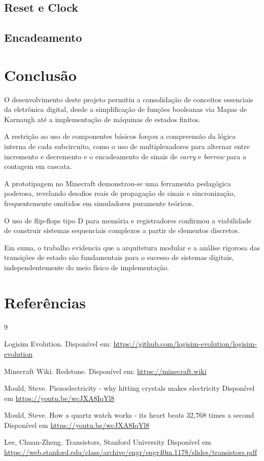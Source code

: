 \documentclass[a4paper,12pt]{article}
\begin{document}
\subsection{Reset e Clock}
\subsection{Encadeamento}

\newpage

\section{Conclusão}

O desenvolvimento deste projeto permitiu a consolidação de conceitos essenciais da eletrônica digital, desde a simplificação de funções booleanas via Mapas de Karnaugh até a implementação de máquinas de estados finitos.

A restrição ao uso de componentes básicos forçou a compreensão da lógica interna de cada subcircuito, como o uso de multiplexadores para alternar entre incremento e decremento e o encadeamento de sinais de \textit{carry} e \textit{borrow} para a contagem em cascata.

A prototipagem no Minecraft demonstrou-se uma ferramenta pedagógica poderosa, revelando desafios reais de propagação de sinais e sincronização, frequentemente omitidos em simuladores puramente teóricos.

O uso de flip-flops tipo D para memória e registradores confirmou a viabilidade de construir sistemas sequenciais complexos a partir de elementos discretos.

Em suma, o trabalho evidencia que a arquitetura modular e a análise rigorosa das transições de estado são fundamentais para o sucesso de sistemas digitais, independentemente do meio físico de implementação.

\newpage

\section{Referências}

\begin{thebibliography}{9}

Logisim Evolution. Disponível em: \url{https://github.com/logisim-evolution/logisim-evolution}

Minecraft Wiki. Redstone. Disponível em: \url{https://minecraft.wiki}

Mould, Steve. Piezoelectricity - why hitting crystals makes electricity Disponível em \url{https://youtu.be/wcJXA8IqYl8}

Mould, Steve. How a quartz watch works - its heart beats 32,768 times a second Disponível em \url{https://youtu.be/wcJXA8IqYl8}

Lee, Chuan-Zheng. Transistors, Stanford University Disponível em \url{https://web.stanford.edu/class/archive/engr/engr40m.1178/slides/transistors.pdf}


\end{thebibliography}
\end{document}

